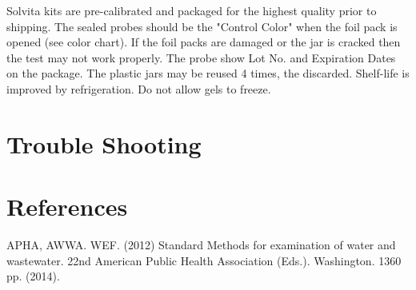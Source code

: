 \documentclass[12pt]{../SOP4_alpha}\usepackage[]{graphicx}\usepackage[]{xcolor}
\begin{document}
\NP Solvita kits are pre-calibrated and packaged for the highest quality prior to shipping. The sealed probes should be the "Control Color" when the foil pack is opened (see color chart). If the foil packs are damaged or the jar is cracked then the test may not work properly. The probe show Lot No. and Expiration Dates on the package. The plastic jars may be reused 4 times, the discarded. Shelf-life is improved by refrigeration. Do not allow gels to freeze. 

\section{Trouble Shooting}



\section{References}




\NP APHA, AWWA. WEF. (2012) Standard Methods for examination of water and wastewater. 22nd American Public Health Association (Eds.). Washington. 1360 pp. (2014).
\end{document}
